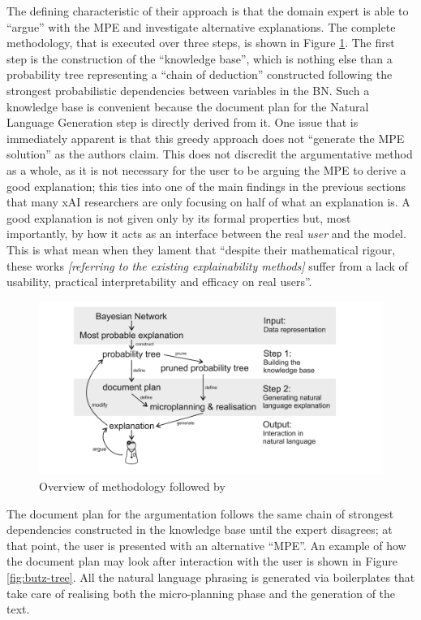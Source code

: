The defining characteristic of their approach is that the domain expert is able to \enquote{argue} with the MPE and investigate alternative explanations.
The complete methodology, that is executed over three steps, is shown in Figure \ref{fig:butz-methodology}.
The first step is the construction of the \enquote{knowledge base}, which is nothing else than a probability tree representing a \enquote{chain of deduction} constructed following the strongest probabilistic dependencies between variables in the BN.
Such a knowledge base is convenient because the document plan for the Natural Language Generation step is directly derived from it.
One issue that is immediately apparent is that this greedy approach does not \enquote{generate the MPE solution} as the authors claim.
This does not discredit the argumentative method as a whole, as it is not necessary for the user to be arguing the MPE to derive a good explanation; this ties into one of the main findings in the previous sections that many xAI researchers are only focusing on half of what an explanation is.
A good explanation is not given only by its formal properties but, most importantly, by how it acts as an interface between the real \textit{user} and the model.
This is what \citet{abdul2018trends} mean when they lament that \enquote{despite their mathematical rigour, these works \textit{[referring to the existing explainability methods]} suffer from a lack of usability, practical interpretability and efficacy on real users}.

\begin{figure}[htbp]
\centerline{\includegraphics[width=\textwidth]{literature-review/images/butz-methodology}}
\caption{Overview of methodology followed by \citet{Butz2018}}
\label{fig:butz-methodology}
\end{figure}

The document plan for the argumentation follows the same chain of strongest dependencies constructed in the knowledge base until the expert disagrees; at that point, the user is presented with an alternative \enquote{MPE}.
An example of how the document plan may look after interaction with the user is shown in Figure \ref{fig:butz-tree}.
All the natural language phrasing is generated via boilerplates that take care of realising both the micro-planning phase and the generation of the text.

